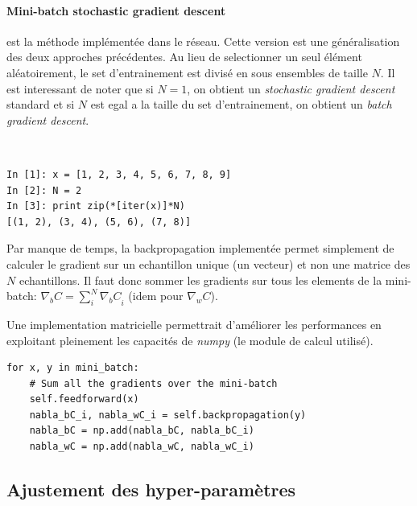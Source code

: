 \documentclass[11pt]{article}
\begin{document}
\paragraph{Mini-batch stochastic gradient descent} est la m\'ethode impl\'ement\'ee
dans le r\'eseau. Cette version est une g\'en\'eralisation des deux approches
pr\'ec\'edentes. Au lieu de selectionner un seul \'el\'ement al\'eatoirement,
le set d'entrainement est divis\'e en sous ensembles de taille $N$. Il est
interessant de noter que si $N=1$, on obtient un \emph{stochastic gradient descent}
standard et si $N$ est egal a la taille du set d'entrainement, on obtient un
\emph{batch gradient descent}.

 \\
\begin{lstlisting}
In [1]: x = [1, 2, 3, 4, 5, 6, 7, 8, 9]
In [2]: N = 2
In [3]: print zip(*[iter(x)]*N)
[(1, 2), (3, 4), (5, 6), (7, 8)]
\end{lstlisting}

Par manque de temps, la backpropagation implement\'ee permet simplement de
calculer le gradient sur un echantillon unique (un vecteur) et non une matrice
des $N$ echantillons. Il faut donc sommer les gradients sur tous les elements de
la mini-batch: $\nabla_bC = \sum_{i}^{N}{{\nabla_bC}_i}$ (idem pour $\nabla_wC$).

Une implementation matricielle permettrait d'am\'eliorer les performances en
exploitant pleinement les capacit\'es de \emph{numpy} (le module de calcul utilis\'e).
 \\
\begin{lstlisting}
for x, y in mini_batch:
	# Sum all the gradients over the mini-batch
	self.feedforward(x)
	nabla_bC_i, nabla_wC_i = self.backpropagation(y)
	nabla_bC = np.add(nabla_bC, nabla_bC_i)
	nabla_wC = np.add(nabla_wC, nabla_wC_i)
\end{lstlisting}


\subsection{Ajustement des hyper-param\`etres}
\end{document}
